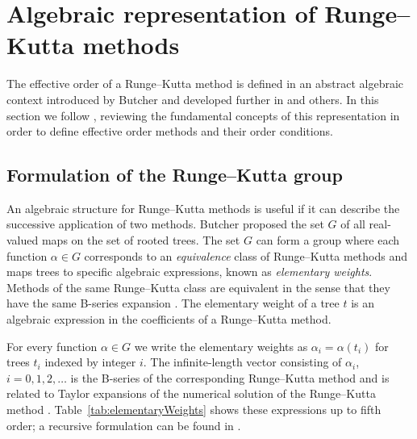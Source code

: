 \section{Algebraic representation of Runge--Kutta methods}\label{sec:Algebraic_RK}

The effective order of a Runge--Kutta method is defined in an abstract algebraic
context introduced by Butcher \cite{Butcher1969} and developed further in
\cite{Butcher1972, Hairer1974, Butcher1996, Butcher1998} and others.
In this section we follow \cite{Butcher2008_book}, reviewing the fundamental
concepts of this representation in order to define effective order methods
and their order conditions.


\subsection{Formulation of the Runge--Kutta group}\label{sec:RK_group}


An algebraic structure for Runge--Kutta methods is useful if it can describe 
the successive application of two methods. 
Butcher \cite{Butcher1972} proposed the set $G$ of all real-valued maps on the 
set of rooted trees. 
The set $G$ can form a group where each function $\alpha \in G$ corresponds 
to an \emph{equivalence} class of Runge--Kutta methods and maps trees to specific 
algebraic expressions, known as \emph{elementary weights}. 
Methods of the same Runge--Kutta class are equivalent in the sense that they have 
the same B-series expansion \cite{Butcher2008_book}.
The elementary weight of a tree $t$ is an algebraic expression in the coefficients 
of a Runge--Kutta method.

For every function $\alpha \in G$ we write the elementary weights as $\alpha_{i} = \alpha(t_{i})$ for trees $t_{i}$ indexed by integer $i$.
The infinite-length vector consisting of $\alpha_i$, $i = 0, 1, 2,\ldots$ is the B-series 
of the corresponding Runge--Kutta method and is related to Taylor expansions of the numerical solution of the Runge--Kutta method \cite{Hairer1974, Butcher2008_book}.
Table~\ref{tab:elementaryWeights} shows these expressions up to fifth order; a recursive formulation can be found in \cite[Definition 312]{Butcher2008_book}.



